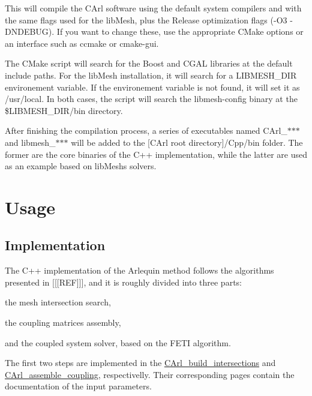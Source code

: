 This will compile the C\+Arl software using the default system compilers and with the same flags used for the lib\+Mesh, plus the {\ttfamily Release} optimization flags ({\ttfamily -\/\+O3 -\/\+D\+N\+D\+E\+B\+U\+G}). If you want to change these, use the appropriate C\+Make options or an interface such as {\ttfamily ccmake} or {\ttfamily cmake-\/gui}.

The C\+Make script will search for the Boost and C\+G\+A\+L libraries at the default include paths. For the lib\+Mesh installation, it will search for a {\ttfamily L\+I\+B\+M\+E\+S\+H\+\_\+\+D\+I\+R} environement variable. If the environement variable is not found, it will set it as {\ttfamily /usr/local}. In both cases, the script will search the {\ttfamily libmesh-\/config} binary at the {\ttfamily \$\+L\+I\+B\+M\+E\+S\+H\+\_\+\+D\+I\+R/bin} directory.

After finishing the compilation process, a series of executables named {\ttfamily C\+Arl\+\_\+$\ast$$\ast$$\ast$} and {\ttfamily libmesh\+\_\+$\ast$$\ast$$\ast$} will be added to the {\ttfamily \mbox{[}C\+Arl root directory\mbox{]}/\+Cpp/bin} folder. The former are the core binaries of the C++ implementation, while the latter are used as an example based on lib\+Mesh\textquotesingle{}s solvers. \hypertarget{cpp_usage}{}\section{Usage}\label{cpp_usage}
\hypertarget{cpp_usage_Implementation}{}\subsection{Implementation}\label{cpp_usage_Implementation}
The C++ implementation of the Arlequin method follows the algorithms presented in \mbox{[}\mbox{[}\mbox{[}R\+E\+F\mbox{]}\mbox{]}\mbox{]}, and it is roughly divided into three parts\+:


\begin{DoxyEnumerate}
\item the mesh intersection search,
\item the coupling matrices assembly,
\item and the coupled system solver, based on the F\+E\+T\+I algorithm.
\end{DoxyEnumerate}

The first two steps are implemented in the \hyperlink{_c_arl__build__intersections_8cpp}{C\+Arl\+\_\+build\+\_\+intersections} and \hyperlink{_c_arl__assemble__coupling_8cpp}{C\+Arl\+\_\+assemble\+\_\+coupling}, respectivelly. Their corresponding pages contain the documentation of the input parameters.

